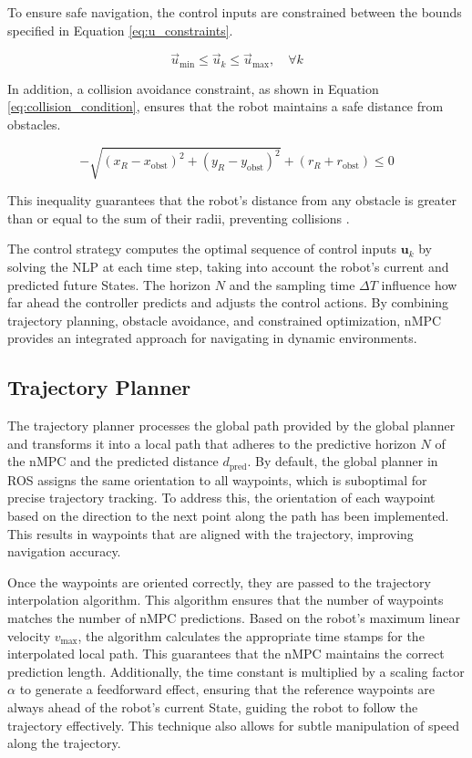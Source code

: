 \documentclass[conference]{IEEEtran}
\begin{document}
To ensure safe navigation, the control inputs are constrained between the bounds specified in Equation \ref{eq:u_constraints}.

\begin{equation}
\label{eq:u_constraints}
\vec{u}_{\text{min}} \leq \vec{u}_k \leq \vec{u}_{\text{max}}, \quad \forall k
\end{equation}

In addition, a collision avoidance constraint, as shown in Equation \ref{eq:collision_condition}, ensures that the robot maintains a safe distance from obstacles.

\begin{equation}
\label{eq:collision_condition}
-\sqrt{(x_R - x_{\text{obst}})^2 + (y_R - y_{\text{obst}})^2} + (r_R + r_{\text{obst}}) \leq 0
\end{equation}

This inequality guarantees that the robot's distance from any obstacle is greater than or equal to the sum of their radii, preventing collisions \cite{frasch2013parallel}.

The control strategy computes the optimal sequence of control inputs \(\mathbf{u}_k\) by solving the NLP at each time step, taking into account the robot's current and predicted future States. The horizon \(N\) and the sampling time \(\Delta T\) influence how far ahead the controller predicts and adjusts the control actions.
By combining trajectory planning, obstacle avoidance, and constrained optimization, nMPC provides an integrated approach for navigating in dynamic environments.


\subsection{Trajectory Planner}

The trajectory planner processes the global path provided by the global planner and transforms it into a local path that adheres to the predictive horizon \( N \) of the nMPC and the predicted distance \( d_{\text{pred}} \). By default, the global planner in ROS assigns the same orientation to all waypoints, which is suboptimal for precise trajectory tracking. To address this, the orientation of each waypoint based on the direction to the next point along the path has been implemented. This results in waypoints that are aligned with the trajectory, improving navigation accuracy.

Once the waypoints are oriented correctly, they are passed to the trajectory interpolation algorithm. This algorithm ensures that the number of waypoints matches the number of nMPC predictions. Based on the robot's maximum linear velocity \( v_{\text{max}} \), the algorithm calculates the appropriate time stamps for the interpolated local path. This guarantees that the nMPC maintains the correct prediction length. Additionally, the time constant is multiplied by a scaling factor \( \alpha \) to generate a feedforward effect, ensuring that the reference waypoints are always ahead of the robot's current State, guiding the robot to follow the trajectory effectively. This technique also allows for subtle manipulation of speed along the trajectory.
\end{document}
